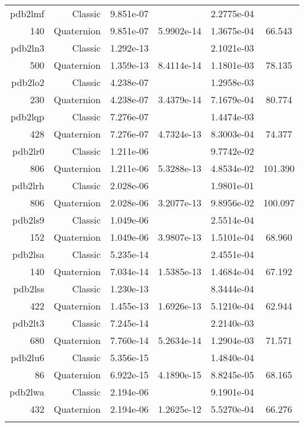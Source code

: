 \begin{xltabular}{\textwidth}{r|rS[table-format=1.3e+2]S[table-format=1.4e+2]S[table-format=1.4e+2]S[table-format=-1.3]}
pdb2lmf & Classic & 9.851e-07 &  & 2.2775e-04 & \\
140 & Quaternion & 9.851e-07 & 5.9902e-14 & 1.3675e-04 & 66.543\\  \addlinespace
pdb2ln3 & Classic & 1.292e-13 &  & 2.1021e-03 & \\
500 & Quaternion & 1.359e-13 & 8.4114e-14 & 1.1801e-03 & 78.135\\  \addlinespace
pdb2lo2 & Classic & 4.238e-07 &  & 1.2958e-03 & \\
230 & Quaternion & 4.238e-07 & 3.4379e-14 & 7.1679e-04 & 80.774\\  \addlinespace
pdb2lqp & Classic & 7.276e-07 &  & 1.4474e-03 & \\
428 & Quaternion & 7.276e-07 & 4.7324e-13 & 8.3003e-04 & 74.377\\  \addlinespace
pdb2lr0 & Classic & 1.211e-06 &  & 9.7742e-02 & \\
806 & Quaternion & 1.211e-06 & 5.3288e-13 & 4.8534e-02 & 101.390\\  \addlinespace
pdb2lrh & Classic & 2.028e-06 &  & 1.9801e-01 & \\
806 & Quaternion & 2.028e-06 & 3.2077e-13 & 9.8956e-02 & 100.097\\  \addlinespace
pdb2ls9 & Classic & 1.049e-06 &  & 2.5514e-04 & \\
152 & Quaternion & 1.049e-06 & 3.9807e-13 & 1.5101e-04 & 68.960\\  \addlinespace
pdb2lsa & Classic & 5.235e-14 &  & 2.4551e-04 & \\
140 & Quaternion & 7.034e-14 & 1.5385e-13 & 1.4684e-04 & 67.192\\  \addlinespace
pdb2lss & Classic & 1.230e-13 &  & 8.3444e-04 & \\
422 & Quaternion & 1.455e-13 & 1.6926e-13 & 5.1210e-04 & 62.944\\  \addlinespace
pdb2lt3 & Classic & 7.245e-14 &  & 2.2140e-03 & \\
680 & Quaternion & 7.760e-14 & 5.2634e-14 & 1.2904e-03 & 71.571\\  \addlinespace
pdb2lu6 & Classic & 5.356e-15 &  & 1.4840e-04 & \\
86 & Quaternion & 6.922e-15 & 4.1890e-15 & 8.8245e-05 & 68.165\\  \addlinespace
pdb2lwa & Classic & 2.194e-06 &  & 9.1901e-04 & \\
432 & Quaternion & 2.194e-06 & 1.2625e-12 & 5.5270e-04 & 66.276\\  \addlinespace

\end{xltabular}
